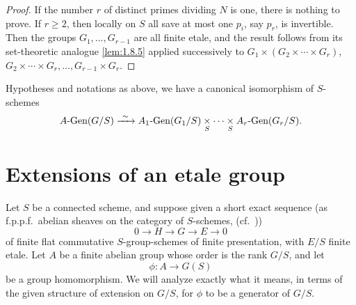 \begin{proof}
If the number $r$ of distinct primes dividing $N$ is one, there is nothing to prove. If $r \ge 2$, then locally on $S$ all save at most one $p_i$, say $p_r$, is invertible. Then the groups $G_1, \dots, G_{r-1}$ are all finite etale, and the result follows from its set-theoretic analogue \ref{lem:1.8.5} applied successively to $G_1 \times (G_2 \times \cdots \times G_r)$, $G_2 \times \cdots \times G_r, \dots, G_{r-1} \times G_r$.
\end{proof}

\begin{corollary}\label{cor:1.10.15}
Hypotheses and notations as above, we have a canonical isomorphism of $S$-schemes
\[
A\text{\rm -Gen}(G/S) \xrightarrow{\ \sim\ } A_1\text{\rm -Gen}(G_1/S) \underset{S}{\times} \cdots \underset{S}{\times} A_r\text{\rm -Gen}(G_r/S).
\]
\end{corollary}

\section{Extensions of an etale group}\label{sec:1.11}

\kmitem\label{km:1.11.1}
Let $S$ be a connected scheme, and suppose given a short exact sequence (as f.p.p.f.\ abelian sheaves on the category of $S$-schemes, (cf.~\cite[III, Exp.~IV]{SGA}))
\begin{equation}\label{eq:1.11.1.1}
0 \longrightarrow H \longrightarrow G \longrightarrow E \longrightarrow 0
\end{equation}
of finite flat commutative $S$-group-schemes of finite presentation, with $E/S$ finite etale. Let $A$ be a finite abelian group whose order is the rank $G/S$, and let
\begin{equation}\label{eq:1.11.1.2}
\phi \colon A \longrightarrow G(S)
\end{equation}
be a group homomorphism. We will analyze exactly what it means, in terms of the given structure of extension on $G/S$, for $\phi$ to be a generator of $G/S$.

